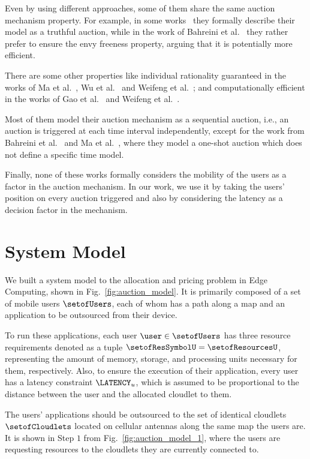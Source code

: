 \documentclass[English]{ic-tese-v3}
\begin{document}
Even by using different approaches, some of them share the same auction mechanism property. For example, in some works~\cite{MaTCDA2022, ZhangNO2020, ShenFPTAS2020, GaoAuction2021} they formally describe their model as a truthful auction, while in the work of Bahreini et al.~\cite{BahreiniMec2021} they rather prefer to ensure the envy freeness property, arguing that it is potentially more efficient. 

There are some other properties like individual rationality guaranteed in the works of Ma et al.~\cite{MaTCDA2022}, Wu et al.~\cite{WuOnline2019} and Weifeng et al.~\cite{WeifengAuction2022}; and computationally efficient in the works of Gao et al.~\cite{GaoAuction2021} and Weifeng et al.~\cite{WeifengAuction2022}.

Most of them model their auction mechanism as a sequential auction, i.e., an auction is triggered at each time interval independently, except for the work from Bahreini et al.~\cite{BahreiniMec2021} and Ma et al.~\cite{MaTCDA2022}, where they model a one-shot auction which does not define a specific time model.
    
Finally, none of these works formally considers the mobility of the users as a factor in the auction mechanism. In our work, we use it by taking the users' position on every auction triggered and also by considering the latency as a decision factor in the mechanism.

\chapter{System Model}
\label{ch:model}
We built a system model to the allocation and pricing problem in Edge Computing, shown in Fig.~\ref{fig:auction_model}. It is primarily composed of a set of mobile users $\setofUsers$,  each of whom has a path along a map and an application to be outsourced from their device. 

To run these applications, each user $\user \in \setofUsers$ has three resource requirements denoted as a tuple $\setofResSymbolU = \setofResourcesU$, representing the amount of memory, storage, and processing units necessary for them, respectively. Also, to ensure the execution of their application, every user has a latency constraint $\LATENCY_u$, which is assumed to be proportional to the distance between the user and the allocated cloudlet to them.

The users' applications should be outsourced to the set of identical cloudlets $\setofCloudlets$ located on cellular antennas along the same map the users are.  It is shown in Step $1$ from Fig.~\ref{fig:auction_model_1}, where the users are requesting resources to the cloudlets they are currently connected to. 
\end{document}
